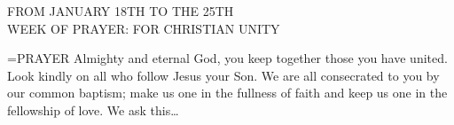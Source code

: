 \begin{center}\normalsize FROM JANUARY 18TH TO THE 25TH\\
\footnotesize WEEK OF PRAYER: FOR CHRISTIAN UNITY\\
\end{center}

\hangindent=\parindent \small{PRAYER 
Almighty and eternal God, you keep together those you have united.
Look kindly on all who follow Jesus your Son. We are all consecrated
to you by our common baptism; make us one in the fullness of faith
and keep us one in the fellowship of love. We ask this…
 \\}
 
